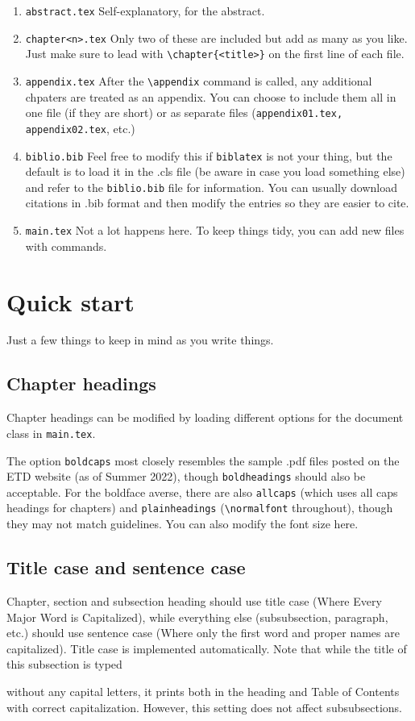 \begin{enumerate}
\item \texttt{abstract.tex} Self-explanatory, for the abstract.
\item \texttt{chapter<n>.tex} Only two of these are included but add as many as you like. Just make sure to lead with \verb|\chapter{<title>}| on the first line of each file.
\item \texttt{appendix.tex} After the \verb|\appendix| command is called, any additional chpaters are treated as an appendix. You can choose to include them all in one file (if they are short) or as separate files (\texttt{appendix01.tex, appendix02.tex}, etc.)
\item \texttt{biblio.bib} Feel free to modify this if \texttt{biblatex} is not your thing, but the default is to load it in the .cls file (be aware in case you load something else) and refer to the \texttt{biblio.bib} file for information. You can usually download citations in .bib format and then modify the entries so they are easier to cite. 
\item \texttt{main.tex} Not a lot happens here. To keep things tidy, you can add new files with \verb|| commands.
\end{enumerate}

\section{Quick start}
Just a few things to keep in mind as you write things. 
\subsection{Chapter headings}
Chapter headings can be modified by loading different options for the document class in \texttt{main.tex}.



The option \texttt{boldcaps} most closely resembles the sample .pdf files posted on the ETD website (as of Summer 2022), though \texttt{boldheadings} should also be acceptable. For the boldface averse, there are also \texttt{allcaps} (which uses all caps headings for chapters) and \texttt{plainheadings} (\verb|\normalfont| throughout), though they may not match guidelines. You can also modify the font size here. 

\subsection{Title case and sentence case}
Chapter, section and subsection heading should use title case (Where Every Major Word is Capitalized), while everything else (subsubsection, paragraph, etc.) should use sentence case (Where only the first word and proper names are capitalized). Title case is implemented automatically. Note that while the title of this subsection is typed

without any capital letters, it prints both in the heading and Table of Contents with correct capitalization. However, this setting does not affect subsubsections.

